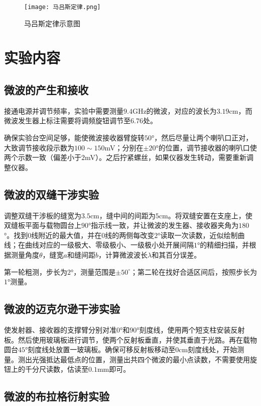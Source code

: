 \documentclass[11pt]{article}
\begin{document}
\begin{figure}[H]
	\centering
	\texttt{[image: 马吕斯定律.png]}
	\caption{马吕斯定律示意图}
\end{figure}

\section{实验内容}

\subsection{微波的产生和接收}

接通电源并调节频率，实验中需要测量$9.4$GHz的微波，对应的波长为$3.19$cm，而微波发生器上标注需要将调频旋钮调节至$6.76$处。

确保实验台空间足够，能使微波接收器臂旋转$50$°，然后尽量让两个喇叭口正对，大致调节接收段示数为$100 \sim 150$mV；分别在$\pm20$°的位置，调节接收器的喇叭口使两个示数一致（偏差小于$2$mV）。之后拧紧螺丝，如果仪器发生转动，需要重新调整仪器。

\subsection{微波的双缝干涉实验}

调整双缝干涉板的缝宽为$3.5$cm，缝中间的间距为$5$cm。将双缝安置在支座上，使双缝板平面与载物圆台上$90$°指示线一致，并让微波的发生器、接收器夹角为$180$°。找到$0$线附近的最大值，并在$0$线的两侧每改变$2$°读取一次读数，近似绘制曲线；在曲线对应的一级极大、零级极小、一级极小处开展间隔$1$°的精细扫描，并根据测量角度$\theta$，缝宽$a$和缝间距$b$，计算微波波长$\lambda$和其百分误差。

第一轮粗测，步长为$2$°，测量范围是$\pm 50 ^\circ$；第二轮在找好合适区间后，按照步长为$1$°测量。

\subsection{微波的迈克尔逊干涉实验}

使发射器、接收器的支撑臂分别对准$0$°和$90$°刻度线，使用两个短支柱安装反射板。然后使用玻璃板进行调节，使两个反射板垂直，并使其垂直于光路。再在载物圆台$45$°刻度线处放置一玻璃板。确保可移反射板移动至0cm刻度线处，开始测量。测出光强抵达最低点的位置，测量出共四个微波的最小点读数，不需要使用旋钮上的千分尺读数，估读至$0.1$mm即可。

\subsection{微波的布拉格衍射实验}
\end{document}
